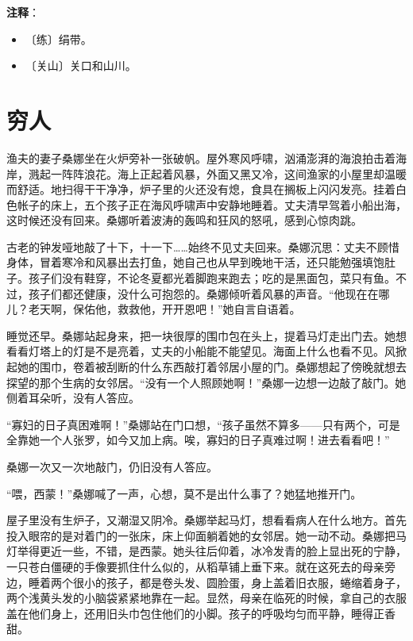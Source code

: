 \documentclass[12pt,UTF-8,openany]{ctexbook}
\begin{document}
\newpage

\textbf{注释}：

\vspace{-1em}

\begin{itemize}
    \setlength\itemsep{-0.2em}
    \item 〔练〕绢带。
    \item 〔关山〕关口和山川。
\end{itemize}

\chapter{穷人}

\begin{large}
    
    渔夫的妻子桑娜坐在火炉旁补一张破帆。屋外寒风呼啸，汹涌澎湃的海浪拍击着海岸，溅起一阵阵浪花。海上正起着风暴，外面又黑又冷，这间渔家的小屋里却温暖而舒适。地扫得干干净净，炉子里的火还没有熄，食具在搁板上闪闪发亮。挂着白色帐子的床上，五个孩子正在海风呼啸声中安静地睡着。丈夫清早驾着小船出海，这时候还没有回来。桑娜听着波涛的轰鸣和狂风的怒吼，感到心惊肉跳。
    
    古老的钟发哑地敲了十下，十一下……始终不见丈夫回来。桑娜沉思：丈夫不顾惜身体，冒着寒冷和风暴出去打鱼，她自己也从早到晚地干活，还只能勉强填饱肚子。孩子们没有鞋穿，不论冬夏都光着脚跑来跑去；吃的是黑面包，菜只有鱼。不过，孩子们都还健康，没什么可抱怨的。桑娜倾听着风暴的声音。“他现在在哪儿？老天啊，保佑他，救救他，开开恩吧！”她自言自语着。
    
    睡觉还早。桑娜站起身来，把一块很厚的围巾包在头上，提着马灯走出门去。她想看看灯塔上的灯是不是亮着，丈夫的小船能不能望见。海面上什么也看不见。风掀起她的围巾，卷着被刮断的什么东西敲打着邻居小屋的门。桑娜想起了傍晚就想去探望的那个生病的女邻居。“没有一个人照顾她啊！”桑娜一边想一边敲了敲门。她侧着耳朵听，没有人答应。
    
    “寡妇的日子真困难啊！”桑娜站在门口想，“孩子虽然不算多——只有两个，可是全靠她一个人张罗，如今又加上病。唉，寡妇的日子真难过啊！进去看看吧！”
    
    桑娜一次又一次地敲门，仍旧没有人答应。
    
    “喂，西蒙！”桑娜喊了一声，心想，莫不是出什么事了？她猛地推开门。
    
    屋子里没有生炉子，又潮湿又阴冷。桑娜举起马灯，想看看病人在什么地方。首先投入眼帘的是对着门的一张床，床上仰面躺着她的女邻居。她一动不动。桑娜把马灯举得更近一些，不错，是西蒙。她头往后仰着，冰冷发青的脸上显出死的宁静，一只苍白僵硬的手像要抓住什么似的，从稻草铺上垂下来。就在这死去的母亲旁边，睡着两个很小的孩子，都是卷头发、圆脸蛋，身上盖着旧衣服，蜷缩着身子，两个浅黄头发的小脑袋紧紧地靠在一起。显然，母亲在临死的时候，拿自己的衣服盖在他们身上，还用旧头巾包住他们的小脚。孩子的呼吸均匀而平静，睡得正香甜。
    

\end{large}
\end{document}
